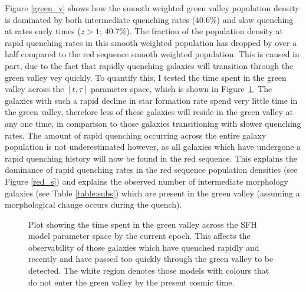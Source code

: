 Figure \ref{green_v} shows how the smooth weighted green valley population density is dominated by both intermediate quenching rates ($40.6\%$) and slow quenching at rates early times ($z > 1$; $40.7\%$). The fraction of the population density at rapid quenching rates in this smooth weighted population has dropped by over a half compared to the red sequence smooth weighted population. This is caused in part, due to the fact that rapidly quenching galaxies will transition through the green valley vey quickly. To quantify this, I tested the time spent in the green valley across the $[t, \tau]$ parameter space, which is shown in Figure~\ref{fig:timeingv}. The galaxies with such a rapid decline in star formation rate spend very little time in the green valley, therefore less of these galaxies will reside in the green valley at any one time, in comparison to those galaxies transitioning with slower quenching rates. The amount of rapid quenching occurring across the entire galaxy population is not underestimated however, as all galaxies which have undergone a rapid quenching history will now be found in the red sequence.  This explains the dominance of rapid quenching rates in the red sequence population densities (see Figure \ref{red_s}) and explains the observed number of intermediate morphology galaxies (see Table \ref{table:subs}) which are present in the green valley (assuming a morphological change occurs during the quench).

\begin{figure}
\caption[Time spent in the green valley across parameter space]{Plot showing the time spent in the green valley across the SFH model parameter space by the current epoch. This affects the observability of those galaxies which have quenched rapidly and recently and have passed too quickly through the green valley to be detected. The white region denotes those models with colours that do not enter the green valley by the present cosmic time.}
\label{fig:timeingv}
\end{figure}

